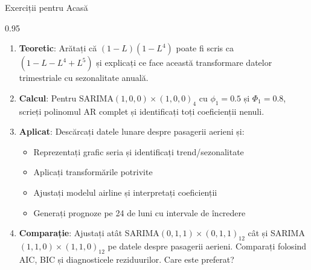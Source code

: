 \documentclass[9pt, aspectratio=169, t]{beamer}
\begin{document}
\begin{frame}{Exerciții pentru Acasă}
    \begin{cminipage}{0.95\textwidth}
    {\small
    \begin{enumerate}\setlength{\itemsep}{0pt}
        \item \textbf{Teoretic}: Arătați că $(1-L)(1-L^4)$ poate fi scris ca $(1 - L - L^4 + L^5)$ și explicați ce face această transformare datelor trimestriale cu sezonalitate anuală.

        \vspace{0.2cm}
        \item \textbf{Calcul}: Pentru SARIMA$(1,0,0) \times (1,0,0)_4$ cu $\phi_1 = 0.5$ și $\Phi_1 = 0.8$, scrieți polinomul AR complet și identificați toți coeficienții nenuli.

        \vspace{0.2cm}
        \item \textbf{Aplicat}: Descărcați datele lunare despre pasagerii aerieni și:
            \begin{itemize}\setlength{\itemsep}{0pt}
                \item Reprezentați grafic seria și identificați trend/sezonalitate
                \item Aplicați transformările potrivite
                \item Ajustați modelul airline și interpretați coeficienții
                \item Generați prognoze pe 24 de luni cu intervale de încredere
            \end{itemize}

        \vspace{0.2cm}
        \item \textbf{Comparație}: Ajustați atât SARIMA$(0,1,1) \times (0,1,1)_{12}$ cât și SARIMA$(1,1,0) \times (1,1,0)_{12}$ pe datele despre pasagerii aerieni. Comparați folosind AIC, BIC și diagnosticele reziduurilor. Care este preferat?
    \end{enumerate}
    }
    \end{cminipage}
\end{frame}
\end{document}
